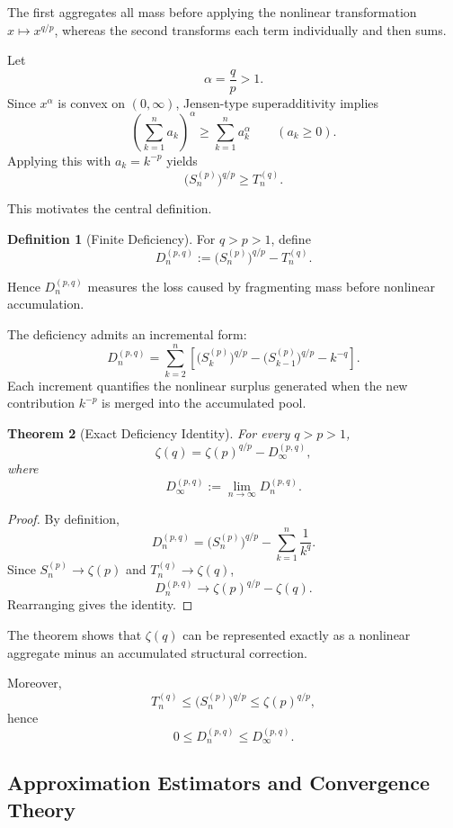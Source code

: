 \documentclass[11pt]{article}
\numberwithin{equation}{section}
\newtheorem{theorem}{Theorem}[section]
\theoremstyle{definition}
\newtheorem{definition}[theorem]{Definition}
\begin{document}
The first aggregates all mass before applying the nonlinear transformation \(x\mapsto x^{q/p}\), whereas the second transforms each term individually and then sums.

Let
\[
\alpha=\frac{q}{p}>1.
\]
Since \(x^\alpha\) is convex on \((0,\infty)\), Jensen-type superadditivity implies
\[
\left(\sum_{k=1}^{n}a_k\right)^\alpha
\ge
\sum_{k=1}^{n}a_k^\alpha
\qquad (a_k\ge0).
\]
Applying this with \(a_k=k^{-p}\) yields
\[
\bigl(S_n^{(p)}\bigr)^{q/p}\ge T_n^{(q)}.
\]

This motivates the central definition.

\begin{definition}[Finite Deficiency]
For \(q>p>1\), define
\[
D_n^{(p,q)}
:=
\bigl(S_n^{(p)}\bigr)^{q/p}-T_n^{(q)}.
\]
\end{definition}

Hence \(D_n^{(p,q)}\) measures the loss caused by fragmenting mass before nonlinear accumulation.

The deficiency admits an incremental form:
\[
D_n^{(p,q)}
=
\sum_{k=2}^{n}
\left[
\bigl(S_k^{(p)}\bigr)^{q/p}
-
\bigl(S_{k-1}^{(p)}\bigr)^{q/p}
-
k^{-q}
\right].
\]
Each increment quantifies the nonlinear surplus generated when the new contribution \(k^{-p}\) is merged into the accumulated pool.

\begin{theorem}[Exact Deficiency Identity]
\label{thm:exact}
For every \(q>p>1\),
\[
\boxed{
\zeta(q)=\zeta(p)^{q/p}-D_\infty^{(p,q)},
}
\]
where
\[
D_\infty^{(p,q)}:=\lim_{n\to\infty}D_n^{(p,q)}.
\]
\end{theorem}

\begin{proof}
By definition,
\[
D_n^{(p,q)}
=
\bigl(S_n^{(p)}\bigr)^{q/p}
-
\sum_{k=1}^{n}\frac{1}{k^q}.
\]
Since \(S_n^{(p)}\to\zeta(p)\) and \(T_n^{(q)}\to\zeta(q)\),
\[
D_n^{(p,q)}\to \zeta(p)^{q/p}-\zeta(q).
\]
Rearranging gives the identity.
\end{proof}

The theorem shows that \(\zeta(q)\) can be represented exactly as a nonlinear aggregate minus an accumulated structural correction.

Moreover,
\[
T_n^{(q)}
\le
\bigl(S_n^{(p)}\bigr)^{q/p}
\le
\zeta(p)^{q/p},
\]
hence
\[
0\le D_n^{(p,q)}\le D_\infty^{(p,q)}.
\]

\subsection{Approximation Estimators and Convergence Theory}
\end{document}

